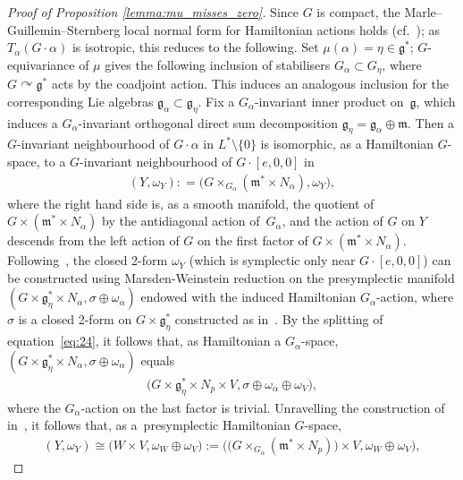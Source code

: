 \documentclass[10pt,a4paper]{amsart}
\numberwithin{equation}{section}
\newcommand{\CM}{(M,H)} %
\newcommand{\SYM}{L^* \setminus \{0\}} %
\begin{document}
\begin{proof}[Proof of Proposition \ref{lemma:mu_misses_zero}]
Since $G$ is compact, the Marle--Guillemin--Sternberg local normal form for Hamiltonian actions holds (cf.~\cite{guillemin_sternberg,marle_ham}); as $T_{\alpha} ( G \cdot \alpha )$ is isotropic, this reduces to the following. Set $\mu(\alpha) = \eta \in \mathfrak{g}^*$; $G$-equivariance of $\mu$ gives the following inclusion of stabilisers $G_{\alpha} \subset G_{\eta}$, where $G \curvearrowright \mathfrak{g}^*$ acts by the coadjoint action. This induces an analogous inclusion for the corresponding Lie algebras $\mathfrak{g}_{\alpha} \subset \mathfrak{g}_{\eta}$. Fix a $G_{\alpha}$-invariant inner product on~$\mathfrak{g}$, which induces a $G_{\alpha}$-invariant orthogonal direct sum decomposition $\mathfrak{g}_{\eta} = \mathfrak{g}_{\alpha} \oplus \mathfrak{m}$. Then a $G$-invariant neighbourhood of $G\cdot \alpha$ in $\SYM$ is isomorphic, as a Hamiltonian $G$-space, to a $G$-invariant neighbourhood of $G \cdot [e,0,0]$ in
 \begin{gather*}
(Y,\omega_Y) : = \big(G \times_{G_{\alpha}} (\mathfrak{m}^* \times N_{\alpha}), \omega_Y \big),
 \end{gather*}
where the right hand side is, as a smooth manifold, the quotient of $G \times ( \mathfrak{m}^* \times N_{\alpha})$ by the antidiagonal action of~$G_{\alpha}$, and the action of $G$ on $Y$ descends from the left action of $G$ on the f\/irst factor of $G \times (\mathfrak{m}^* \times N_{\alpha})$. Following~\cite{ortega_ratiu,sl}, the closed 2-form $\omega_Y$ (which is symplectic only near $G \cdot [e,0,0]$) can be constructed using Marsden-Weinstein reduction on the presymplectic manifold $(G \times \mathfrak{g}^*_{\eta} \times N_{\alpha}, \sigma \oplus \omega_{\alpha})$ endowed with the induced
 Hamiltonian $G_{\alpha}$-action, where $\sigma$ is a closed 2-form on $G \times \mathfrak{g}^*_{\eta}$ constructed as in~\cite{ortega_ratiu}. By the splitting of equation~\eqref{eq:24}, it follows that, as Hamiltonian a $G_{\alpha}$-space, $(G \times \mathfrak{g}^*_{\eta} \times N_{\alpha}, \sigma \oplus \omega_{\alpha})$ equals
 \begin{gather*}
 \big(G \times \mathfrak{g}^*_{\eta} \times N_{p} \times V, \sigma \oplus \omega_{\alpha} \oplus \omega_V \big),
 \end{gather*}
 where the $G_{\alpha}$-action on the last factor is trivial. Unravelling the construction of in~\cite{ortega_ratiu,sl}, it follows that, as a~presymplectic
 Hamiltonian $G$-space,
 \begin{gather*}
 (Y,\omega_Y) \cong \big(W \times V, \omega_W \oplus \omega_V\big):=\big(\big(G \times_{G_{\alpha}} (\mathfrak{m}^* \times N_{p} )\big) \times V, \omega_W \oplus \omega_V \big),

\end{gather*}
\end{proof}
\end{document}
